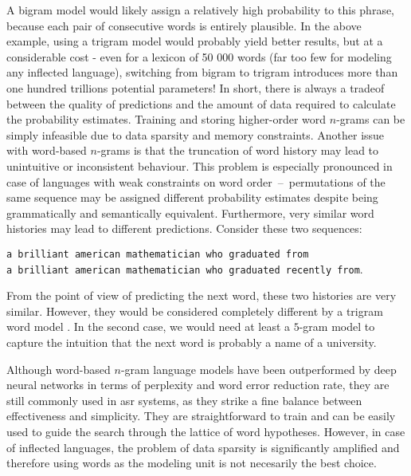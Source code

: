 	A bigram model would likely assign a relatively high probability to this phrase, because each pair of consecutive words is entirely plausible. 
	In the above example, using a trigram model would probably yield better results, but at a considerable cost - even for a lexicon of 50 000 words (far too few for modeling any inflected language), switching from bigram to trigram introduces more than one hundred trillions potential parameters! In short, there is always a tradeof between the quality of predictions and the amount of data required to calculate the probability estimates. Training and storing higher-order word \mbox{$n$-gram}s can be simply infeasible due to data sparsity and memory constraints.
	Another issue with word-based \mbox{$n$-gram}s is that the truncation of word history may lead to unintuitive or inconsistent behaviour. This problem is especially pronounced in case of languages with weak constraints on word order~--~permutations of the same sequence may be assigned different probability estimates despite being grammatically and semantically equivalent. Furthermore, very similar word histories may lead to different predictions. Consider these two sequences:
	\begin{center}
		\texttt{a brilliant american mathematician who graduated from} \\
		\texttt{a brilliant american mathematician who graduated recently from}.
	\end{center}
	From the point of view of predicting the next word, these two histories are very similar. However, they would be considered completely different by a trigram word model \cite{whittaker2000statistical}. In the second case, we would need at least a $5$-gram model to capture the intuition that the next word is probably a name of a university.

	Although word-based \mbox{$n$-gram} language models have been outperformed by deep neural networks in terms of perplexity and word error reduction rate, they are still commonly used in \gls{asr} systems, as they strike a fine balance between effectiveness and simplicity. They are straightforward to train and can be easily used to guide the search through the lattice of word hypotheses. However, in case of inflected languages, the problem of data sparsity is significantly amplified and therefore using words as the modeling unit is not necesarily the best choice.
